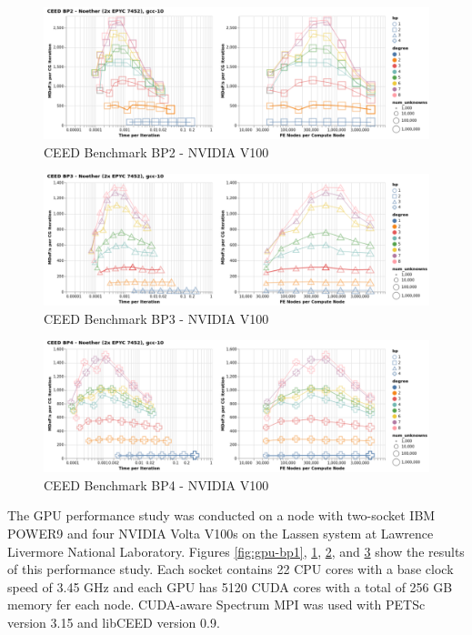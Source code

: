 \begin{figure}[ht!]
\includegraphics[width=.99\linewidth]{../img/xsmmSerialBP2Clip}
\caption{CEED Benchmark BP2 - NVIDIA V100}
\label{fig:gpu-bp2}
\end{figure}

\begin{figure}[ht!]
\includegraphics[width=.99\linewidth]{../img/xsmmSerialBP3Clip}
\caption{CEED Benchmark BP3 - NVIDIA V100}
\label{fig:gpu-bp3}
\end{figure}

\begin{figure}[ht!]
\includegraphics[width=.99\linewidth]{../img/xsmmSerialBP4Clip}
\caption{CEED Benchmark BP4 - NVIDIA V100}
\label{fig:gpu-bp4}
\end{figure}

The GPU performance study was conducted on a node with two-socket IBM POWER9 and four NVIDIA Volta V100s on the Lassen system at Lawrence Livermore National Laboratory.
Figures \ref{fig:gpu-bp1}, \ref{fig:gpu-bp2}, \ref{fig:gpu-bp3}, and \ref{fig:gpu-bp4} show the results of this performance study.
Each socket contains 22 CPU cores with a base clock speed of 3.45 GHz and each GPU has 5120 CUDA cores with a total of 256 GB memory fer each node.
CUDA-aware Spectrum MPI was used with PETSc \cite{petsc-user-ref} version 3.15 and libCEED \cite{libceed} version 0.9.

